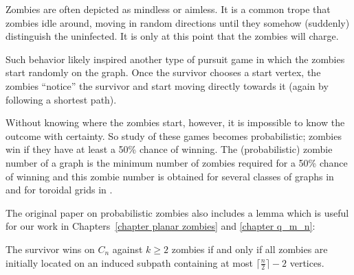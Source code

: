 Zombies are often depicted as mindless or aimless. It is a common trope that zombies
idle around, moving in random directions until they somehow (suddenly) distinguish
the uninfected. It is only at this point that the zombies will charge.

Such behavior likely inspired another type of pursuit game \cite{bonato2016probabilistic} in which the zombies start randomly on
the graph. Once the survivor chooses a start vertex, the zombies ``notice'' the survivor and start
moving directly towards it (again by following a shortest path).

Without knowing where the zombies start, however, it is impossible to know the outcome with certainty.
So study of these games becomes probabilistic; zombies win if they have at least a 50\% chance of winning.
The (probabilistic) zombie number of a graph is the minimum number of zombies required for a 50\% chance of winning and this zombie number is
obtained for several classes of graphs in \cite{bonato2016probabilistic} and for
toroidal grids in \cite{pralat2019many}.

The original paper on probabilistic zombies \cite{bonato2016probabilistic} also includes a lemma which is useful for our work
in Chapters~\ref{chapter planar zombies} and \ref{chapter q_m_n}:

\begin{lemma} The survivor wins on $C_n$ against $k \geq 2$ zombies if and only if all zombies are initially located on an induced subpath
containing at most $\lceil\frac{n}{2}\rceil-2$ vertices.
\end{lemma}
